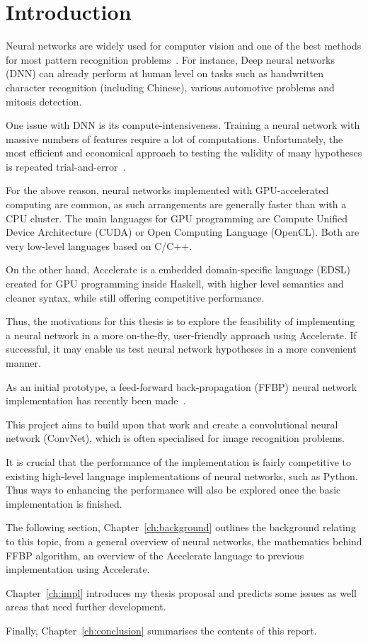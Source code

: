 \chapter{Introduction}\label{ch:intro}

Neural networks are widely used for computer vision and one of the best methods for most pattern recognition problems~\cite{Nvi14}. For instance, Deep neural networks (DNN) can already perform at human level on tasks such as handwritten character recognition (including Chinese), various automotive problems and mitosis detection.

One issue with DNN is its compute-intensiveness. Training a neural network with massive numbers of features require a lot of computations. Unfortunately, the most efficient and economical approach to testing the validity of many hypotheses is repeated trial-and-error~\cite{Ng12}.

For the above reason, neural networks implemented with GPU-accelerated computing are common, as such arrangements are generally faster than with a CPU cluster. The main languages for GPU programming are Compute Unified Device Architecture (CUDA) or Open Computing Language (OpenCL). Both are very low-level languages based on C/C++. 

On the other hand, Accelerate is a embedded domain-specific language (EDSL) created for GPU programming inside Haskell, with higher level semantics and cleaner syntax, while still offering competitive performance. 

Thus, the motivations for this thesis is to explore the feasibility of implementing a neural network in a more on-the-fly, user-friendly approach using Accelerate. If successful, it may enable us test neural network hypotheses in a more convenient manner. 

As an initial prototype, a feed-forward back-propagation (FFBP) neural network implementation has recently been made~\cite{Eve16}. 


This project aims to build upon that work and create a convolutional neural network (ConvNet), which is often specialised for image recognition problems.

It is crucial that the performance of the implementation is fairly competitive to existing high-level language implementations of neural networks, such as Python. Thus ways to enhancing the performance will also be explored once the basic implementation is finished.


The following section, Chapter~\ref{ch:background} outlines the background relating to this topic, from a general overview of neural networks, the mathematics behind FFBP algorithm, an overview of the Accelerate language to previous implementation using Accelerate.

Chapter~\ref{ch:impl} introduces my thesis proposal and predicts some issues as well areas that need further development.

Finally, Chapter~\ref{ch:conclusion} summarises the contents of this report.